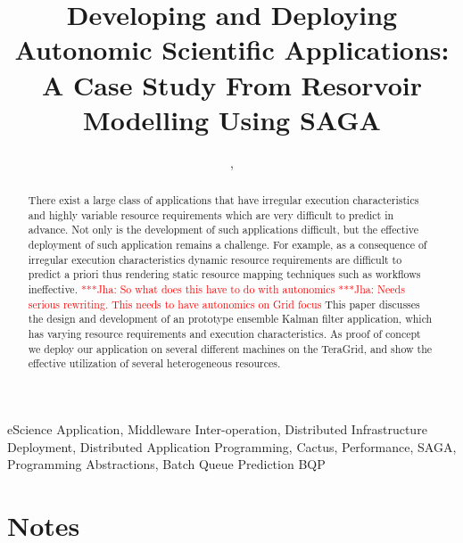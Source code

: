 \documentclass[conference,final]{IEEEtran}
\newcommand{\jhanote}[1]{ {\textcolor{red} { ***Jha: #1 }}}
\begin{document}
\title{\large Developing and Deploying Autonomic Scientific
  Applications: A Case Study From Resorvoir Modelling Using SAGA}
  
\author{,
    
}
\maketitle

 \begin{abstract}
   There exist a large class of applications that have irregular
   execution characteristics and highly variable resource requirements
   which are very difficult to predict in advance.  Not only is the
   development of such applications difficult, but the effective
   deployment of such application remains a challenge.  For example,
   as a consequence of irregular execution characteristics dynamic
   resource requirements are difficult to predict a priori thus
   rendering static resource mapping techniques such as workflows
   ineffective.  \jhanote{So what does this have to do with
     autonomics} \jhanote{Needs serious rewriting. This needs to have
     autonomics on Grid focus} This paper discusses the design and
   development of an prototype ensemble Kalman filter application,
   which has varying resource requirements and execution
   characteristics.  As proof of concept we deploy our application on
   several different machines on the TeraGrid, and show the effective
   utilization of several heterogeneous resources.
 \end{abstract}
 \begin{keywords}
   eScience Application, Middleware Inter-operation, Distributed
   Infrastructure Deployment, Distributed Application Programming,
   Cactus, Performance, SAGA, Programming Abstractions, Batch Queue
   Prediction BQP
 \end{keywords}

\section*{Notes}
\end{document}
